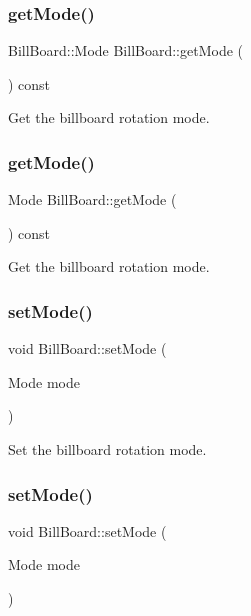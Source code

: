 \subsubsection{\texorpdfstring{get\+Mode()}{getMode()}\hspace{0.1cm}{\footnotesize\ttfamily [1/2]}}
{\footnotesize\ttfamily Bill\+Board\+::\+Mode Bill\+Board\+::get\+Mode (\begin{DoxyParamCaption}{ }\end{DoxyParamCaption}) const}

Get the billboard rotation mode. \mbox{\label{classBillBoard_ae95e97903db0f6748398ad93ab12975a}} 
\subsubsection{\texorpdfstring{get\+Mode()}{getMode()}\hspace{0.1cm}{\footnotesize\ttfamily [2/2]}}
{\footnotesize\ttfamily Mode Bill\+Board\+::get\+Mode (\begin{DoxyParamCaption}{ }\end{DoxyParamCaption}) const}

Get the billboard rotation mode. \mbox{\label{classBillBoard_aa65a9fad6b05fd10fafaf50ad70b94d1}} 
\subsubsection{\texorpdfstring{set\+Mode()}{setMode()}\hspace{0.1cm}{\footnotesize\ttfamily [1/2]}}
{\footnotesize\ttfamily void Bill\+Board\+::set\+Mode (\begin{DoxyParamCaption}\item[{Mode}]{mode }\end{DoxyParamCaption})}

Set the billboard rotation mode. \mbox{\label{classBillBoard_aa65a9fad6b05fd10fafaf50ad70b94d1}} 
\subsubsection{\texorpdfstring{set\+Mode()}{setMode()}\hspace{0.1cm}{\footnotesize\ttfamily [2/2]}}
{\footnotesize\ttfamily void Bill\+Board\+::set\+Mode (\begin{DoxyParamCaption}\item[{Mode}]{mode }\end{DoxyParamCaption})}

